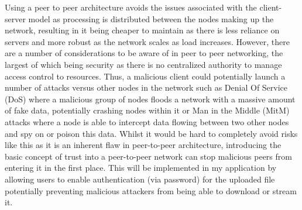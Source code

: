 \documentclass[]{report}
\begin{document}
			Using a peer to peer architecture avoids the issues associated with the client-server model as processing is distributed between the nodes making up the network, resulting in it being cheaper to maintain as there is less reliance on servers and more robust as the network scales as load increases. However, there are a number of considerations to be aware of in peer to peer networking, the largest of which being security as there is no centralized authority to manage access control to resources. Thus, a malicious client could potentially launch a number of attacks versus other nodes in the network such as Denial Of Service (DoS) where a malicious group of nodes floods a network with a massive amount of fake data, potentially crashing nodes within it or Man in the Middle (MitM) attacks where a node is able to intercept data flowing between two other nodes and spy on or poison this data\cite{P2P Security Issues}. Whilst it would be hard to completely avoid risks like this as it is an inherent flaw in peer-to-peer architecture, introducing the basic concept of trust into a peer-to-peer network can stop malicious peers from entering it in the first place. This will be implemented in my application by allowing users to enable authentication (via password) for the uploaded file potentially preventing malicious attackers from being able to download or stream it. 
			
\end{document}
